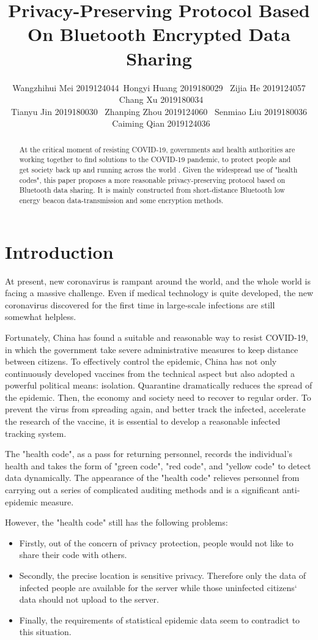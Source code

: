\documentclass[11pt,en]{elegantpaper}
\title{Privacy-Preserving Protocol Based On Bluetooth Encrypted Data Sharing}
\author{Wangzhihui Mei 2019124044\ Hongyi Huang 2019180029 \ Zijia He 2019124057 \ Chang Xu 2019180034\\ Tianyu Jin 2019180030 \ Zhanping Zhou 2019124060 \ Senmiao Liu 2019180036 \ Caiming Qian 2019124036}
\institute{CCNU-UOW JI}
\date{}
\begin{document}
\maketitle

\begin{abstract}
	At the critical moment of resisting COVID-19, governments and health authorities are working together to find solutions to the COVID‑19 pandemic, to protect people and get society back up and running across the world\cite{guan2020clinical} . Given the widespread use of "health codes", this paper proposes a more reasonable privacy-preserving protocol based on Bluetooth data sharing. It is mainly constructed from short-distance Bluetooth low energy beacon data-transmission and some encryption methods.
\end{abstract}

\section{Introduction}
At present, new coronavirus is rampant around the world, and the whole world is facing a massive challenge. Even if medical technology is quite developed, the new coronavirus discovered for the first time in large-scale infections are still somewhat helpless.

Fortunately, China has found a suitable and reasonable way to resist COVID-19, in which the government take severe administrative measures to keep distance between citizens. To effectively control the epidemic, China has not only continuously developed vaccines from the technical aspect but also adopted a powerful political means: isolation. Quarantine dramatically reduces the spread of the epidemic. Then,  the economy and society need to recover to regular order. To prevent the virus from spreading again, and better track the infected, accelerate the research of the vaccine, it is essential to develop a reasonable infected tracking system.

The "health code", as a pass for returning personnel, records the individual's health and takes the form of "green code", "red code", and "yellow code" to detect data dynamically. The appearance of the "health code" relieves personnel from carrying out a series of complicated auditing methods and is a significant anti-epidemic measure.

However, the "health code" still has the following problems:

\begin{itemize}
	\item Firstly, out of the concern of privacy protection, people would not like to share their code with others.
	\item Secondly, the precise location is sensitive privacy. Therefore only the data of infected people are available for the server while those uninfected citizens‘ data should not upload to the server.
	\item Finally, the requirements of statistical epidemic data seem to contradict to this situation.
\end{itemize}
\end{document}
